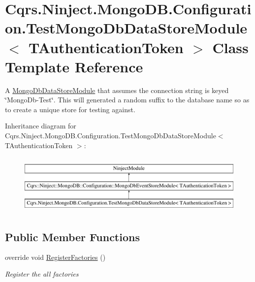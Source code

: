 \hypertarget{classCqrs_1_1Ninject_1_1MongoDB_1_1Configuration_1_1TestMongoDbDataStoreModule}{}\section{Cqrs.\+Ninject.\+Mongo\+D\+B.\+Configuration.\+Test\+Mongo\+Db\+Data\+Store\+Module$<$ T\+Authentication\+Token $>$ Class Template Reference}
\label{classCqrs_1_1Ninject_1_1MongoDB_1_1Configuration_1_1TestMongoDbDataStoreModule}


A \hyperlink{classCqrs_1_1Ninject_1_1MongoDB_1_1Configuration_1_1MongoDbDataStoreModule}{Mongo\+Db\+Data\+Store\+Module} that assumes the connection string is keyed \char`\"{}\+Mongo\+Db-\/\+Test\char`\"{}. This will generated a random suffix to the database name so as to create a unique store for testing against.  


Inheritance diagram for Cqrs.\+Ninject.\+Mongo\+D\+B.\+Configuration.\+Test\+Mongo\+Db\+Data\+Store\+Module$<$ T\+Authentication\+Token $>$\+:\begin{figure}[H]
\begin{center}
\leavevmode
\includegraphics[height=3.000000cm]{classCqrs_1_1Ninject_1_1MongoDB_1_1Configuration_1_1TestMongoDbDataStoreModule}
\end{center}
\end{figure}
\subsection*{Public Member Functions}
\begin{DoxyCompactItemize}
\item 
override void \hyperlink{classCqrs_1_1Ninject_1_1MongoDB_1_1Configuration_1_1TestMongoDbDataStoreModule_abff300412dc5c2602db5f51925204c6e_abff300412dc5c2602db5f51925204c6e}{Register\+Factories} ()
\begin{DoxyCompactList}\small\item\em Register the all factories \end{DoxyCompactList}\end{DoxyCompactItemize}


